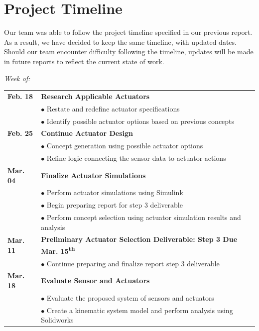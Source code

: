 \documentclass[12pt]{article}
\newcommand{\ts}{\textsuperscript}
\begin{document}
\section{Project Timeline}
Our team was able to follow the project timeline specified in our previous report. As a result, we have decided to keep the same timeline, with updated dates. Should our team encounter difficulty following the timeline, updates will be made in future reports to reflect the current state of work.\\
\begin{flushleft}

\textit{Week of:}

\begin{tabular}{l | l} 
\textbf{Feb. 18} &\textbf{Research Applicable Actuators}\\
 & $\bullet$ Restate and redefine actuator specifications\\
  & $\bullet$ Identify possible actuator options based on previous concepts\\
  
\textbf{Feb. 25} & \textbf{Continue Actuator Design}\\
 & $\bullet$ Concept generation using possible actuator options\\
  & $\bullet$ Refine logic connecting the sensor data to actuator actions\\
  
\textbf{Mar. 04} & \textbf{Finalize Actuator Simulations}\\
 & $\bullet$ Perform actuator simulations using Simulink\\
 & $\bullet$ Begin preparing report for step 3 deliverable\\
 & $\bullet$ Perform concept selection using actuator simulation results and analysis\\
 
\textbf{Mar. 11} &\textbf{Preliminary Actuator Selection Deliverable: Step 3 Due Mar. 15\ts{th}}\\
 & $\bullet$ Continue preparing and finalize report step 3 deliverable\\
 
\textbf{Mar. 18} & \textbf{Evaluate Sensor and Actuators}\\
 & $\bullet$ Evaluate the proposed system of sensors and actuators\\
  & $\bullet$ Create a kinematic system model and perform analysis using Solidworks\\
  

\end{tabular}
\end{flushleft}
\end{document}
